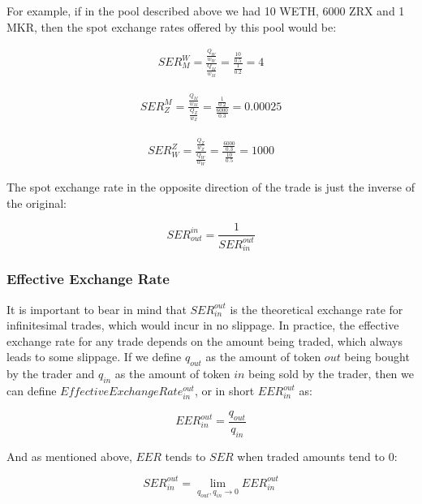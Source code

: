 \documentclass[11pt]{amsart}
\begin{document}
For example, if in the pool described above we had 10 WETH, 6000 ZRX and 1 MKR, then the spot exchange rates offered by this pool would be:

\begin{align*}
SER^{W}_{M} = \frac{\frac{Q_{W}}{w_{W}}}{\frac{Q_{M}}{w_{M}}} = \frac{\frac{10}{0.5}}{\frac{1}{0.2}} = 4  \end{align*}

\begin{align*}
SER^{M}_{Z} = \frac{\frac{Q_{M}}{w_{M}}}{\frac{Q_{Z}}{w_{Z}}} = \frac{\frac{1}{0.2}}{\frac{6000}{0.3}} = 0.00025
\end{align*}

\begin{align*}
SER^{Z}_{W} = \frac{\frac{Q_{Z}}{w_{Z}}}{\frac{Q_{W}}{w_{W}}} = \frac{\frac{6000}{0.3}}{\frac{10}{0.5}} = 1000 \end{align*}

The spot exchange rate in the opposite direction of the trade is just the inverse of the original:

\begin{equation}
SER^{in}_{out} = \frac{1}{SER^{out}_{in}} 
\end{equation}

\subsubsection{Effective Exchange Rate}

It is important to bear in mind that $SER^{out}_{in}$ is the theoretical exchange rate for infinitesimal trades, which would incur in no slippage. In practice, the effective exchange rate for any trade depends on the amount being traded, which always leads to some slippage. If we define $q_{out}$ as the amount of token $out$ being bought by the trader and $q_{in}$ as the amount of token $in$ being sold by the trader, then we can define $EffectiveExchangeRate^{out}_{in}$, or in short $EER^{out}_{in}$ as:

\begin{equation}
EER^{out}_{in} = \frac{q_{out}}{q_{in}} \end{equation}

And as mentioned above, $EER$ tends to $SER$ when traded amounts tend to 0:

\begin{equation}
\label{equation:EER_tends_to_SER}
SER^{out}_{in} = \lim_{q_{out},q_{in}\to 0} EER^{out}_{in}
\end{equation}
\end{document}
